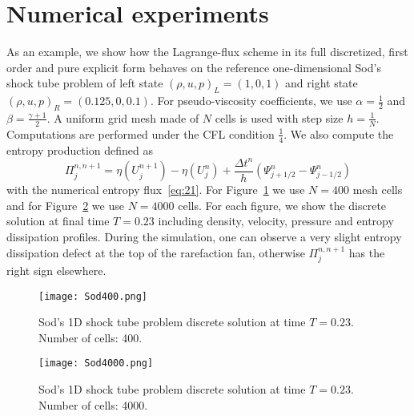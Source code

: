 \documentclass[graybox]{svmult}
\begin{document}
\section{Numerical experiments}
%
As an example, we show how the Lagrange-flux scheme in its full discretized,
first order and pure explicit
form behaves on the reference one-dimensional Sod's shock tube problem of left state 
$(\rho,u,p)_L=(1,0,1)$ and right state $(\rho,u,p)_R=(0.125,0,0.1)$.
For pseudo-viscosity coefficients, we use $\alpha=\frac{1}{2}$ and $\beta=\frac{\gamma+1}{2}$.
A uniform grid mesh made of $N$ cells is used with step size $h=\frac{1}{N}$. Computations are performed under the CFL condition $\frac{1}{4}$. We also compute the entropy production defined as
\[
\Pi_j^{n,n+1} = \eta(U_j^{n+1})-\eta(U_j^n) + \frac{\Delta t^n}{h}\left(\Psi_{j+1/2}^n-\Psi_{j-1/2}^n\right)
\]
with the numerical entropy flux~\eqref{eq:21}. For Figure~\ref{fig:1} we use $N=400$ mesh
cells and for Figure~\ref{fig:2} we use $N=4000$ cells. For each figure, we show the discrete
solution at final time $T=0.23$ including density, velocity, pressure and entropy dissipation profiles. During the simulation, one can observe a very slight entropy dissipation defect at the
top of the rarefaction fan, otherwise $\Pi_j^{n,n+1}$ has the right sign elsewhere.
%
\vspace{-0.5cm}
\begin{figure}[h!]
\hspace{-1.4cm}\texttt{[image: Sod400.png]}
\caption{Sod's 1D shock tube problem discrete solution at time $T=0.23$.
Number of cells: 400.}\label{fig:1}
\end{figure}
%
\vspace{-0.5cm}
\begin{figure}[h!]
\hspace{-1.2cm}\texttt{[image: Sod4000.png]}
\caption{Sod's 1D shock tube problem discrete solution at time $T=0.23$.
Number of cells: 4000.}\label{fig:2}
\end{figure}
%
\vspace{-1.3cm}
\end{document}

